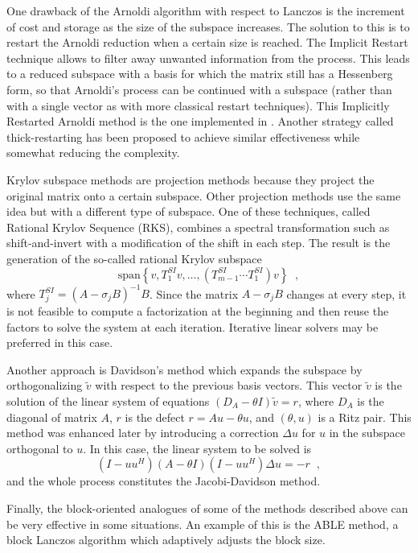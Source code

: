 	One drawback of the Arnoldi algorithm with respect to Lanczos is the increment of cost and storage as the size of the subspace increases. The solution to this is to restart the Arnoldi reduction when a certain size is reached. The Implicit Restart technique allows to filter away unwanted information from the process. This leads to a reduced subspace with a basis for which the matrix still has a Hessenberg form, so that Arnoldi's process can be continued with a subspace (rather than with a single vector as with more classical restart techniques). This Implicitly Restarted Arnoldi method is the one implemented in \arpack. Another strategy called thick-restarting has been proposed to achieve similar effectiveness while somewhat reducing the complexity.

	Krylov subspace methods are projection methods because they project the original matrix onto a certain subspace. Other projection methods use the same idea but with a different type of subspace. One of these techniques, called Rational Krylov Sequence (RKS), combines a spectral transformation such as shift-and-invert with a modification of the shift in each step. The result is the generation of the so-called rational Krylov subspace
\begin{equation}
\mathrm{span}\left\{v,T_1^{SI}v,\ldots,\left(T_{m-1}^{SI}\cdots T_1^{SI}\right)v\right\}\;\;,
\label{eq:rat-krylov}
\end{equation}
where $T_j^{SI}=(A-\sigma_j B)^{-1}B$. Since the matrix $A-\sigma_j B$ changes at every step, it is not feasible to compute a factorization at the beginning and then reuse the factors to solve the system at each iteration. Iterative linear solvers may be preferred in this case.

	Another approach is Davidson's method which expands the subspace by orthogonalizing $\tilde{v}$ with respect to the previous basis vectors. This vector $\tilde{v}$ is the solution of the linear system of equations $(D\!_A-\theta I)\tilde{v}=r$, where $D\!_A$ is the diagonal of matrix $A$, $r$ is the defect $r=Au-\theta u$, and $(\theta,u)$ is a Ritz pair. This method was enhanced later by introducing a correction $\Delta u$ for $u$ in the subspace orthogonal to $u$. In this case, the linear system to be solved is
\begin{equation}
(I-uu^H)(A-\theta I)(I-uu^H)\Delta u=-r\;\;,
\end{equation}
and the whole process constitutes the Jacobi-Davidson method.

	Finally, the block-oriented analogues of some of the methods described above can be very effective in some situations. An example of this is the ABLE method, a block Lanczos algorithm which adaptively adjusts the block size.

